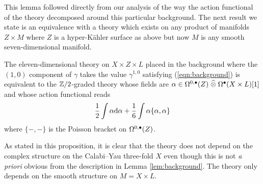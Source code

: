 \documentclass[11pt]{amsart}
\begin{document}
This lemma followed directly from our analysis of the way the action functional of the theory decomposed around this particular background.
The next result we state is an equivalence with a theory which exists on any product of manifolds $Z \times M$ where $Z$ is a hyper-K\"{a}hler surface as above but now $M$ is any smooth seven-dimensional manifold.

\begin{prop}
  The eleven-dimensional theory on $X \times Z \times L$ placed in the background where the $(1,0)$ component of $\gamma$ takes the value $\gamma^{1,0}$ satisfying (\ref{eqn:background}) is equivalent to the $\mathbb Z/2$-graded theory whose fields are
    $\alpha \in \Omega^{0,\bullet}(Z) \; \widehat{\otimes} \; \Omega^\bullet(X \times L) [1]$
  and whose action functional reads
  \[
    \frac12 \int \alpha {\rm d}\alpha + \frac16 \int \alpha \{\alpha, \alpha\}
  \]
  where $\{-,-\}$ is the Poisson bracket on $\Omega^{0,\bullet}(Z)$.
\end{prop}

As stated in this proposition, it is clear that the theory does not depend on the complex structure on the Calabi--Yau three-fold $X$ even though this is not {\em a priori} obvious from the description in Lemma \ref{lem:background}. 
The theory only depends on the smooth structure on $M = X \times L$.
\end{document}
